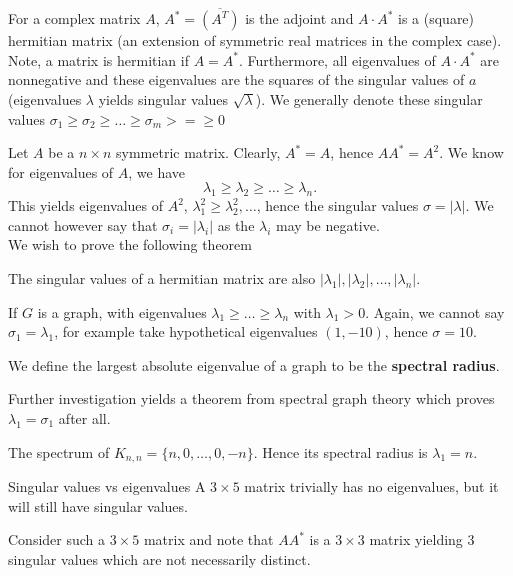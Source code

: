 \begin{recall}
	For a complex matrix \(A\), \(A^{*} = \overline{\left( A^{T} \right)}\) is the adjoint and \(A\cdot A^{*}\) is a (square) hermitian matrix (an extension of symmetric real matrices in the complex case). Note, a matrix is hermitian if \(A = A^{*}\). Furthermore, all eigenvalues of \(A \cdot A^{*}\) are nonnegative and these eigenvalues are the squares of the singular values of \(a\) (eigenvalues \(\lambda\) yields singular values \(\sqrt{\lambda} \)). We generally denote these singular values \(\sigma_1 \ge\sigma_2\ge \ldots\ge \sigma_{m}>= \ge 0\)
\end{recall}
Let \(A\) be a \(n \times n\) symmetric matrix. Clearly, \(A^{*} = A\), hence \(A A^{*} = A^2\). We know for eigenvalues of \(A\), we have \[
\lambda_1\ge \lambda_2 \ge \ldots \ge \lambda_{n}
.\] This yields eigenvalues of \(A^2\), \(\lambda_1^2 \ge \lambda_2^2, \ldots\), hence the singular values \(\sigma = \left| \lambda \right| \). We cannot however say that \(\sigma_{i} = \left| \lambda_{i} \right| \) as the \(\lambda_{i}\) may be negative. \\
We wish to prove the following theorem
\begin{proposition}
	The singular values of a hermitian matrix are also \(\left| \lambda_1 \right|, \left| \lambda_2 \right| , \ldots, \left| \lambda_{n} \right|  \).
\end{proposition}
If \(G\) is a graph, with eigenvalues \(\lambda_1 \ge \ldots  \ge \lambda_{n}\) with \(\lambda_1 > 0\). Again, we cannot say \(\sigma_1 = \lambda_1\), for example take hypothetical eigenvalues \(\left( 1, -10 \right) \), hence \(\sigma = 10\).
\begin{definition}
	We define the largest absolute eigenvalue of a graph to be the \textbf{spectral radius}.
\end{definition}
Further investigation yields a theorem from spectral graph theory which proves \(\lambda_1 = \sigma_1\) after all.
\begin{example}
	The spectrum of \(K_{n, n} = \{n, 0, \ldots, 0, -n\}  \). Hence its spectral radius is \(\lambda_1 = n\).
\end{example}
\begin{note}{Singular values vs eigenvalues}
	A \(3 \times 5\) matrix trivially has no eigenvalues, but it will still have singular values.
\end{note}
Consider such a \(3 \times 5\) matrix and note that \(A A^{*}\) is a \(3\times 3\) matrix yielding \(3\) singular values which are not necessarily distinct.

